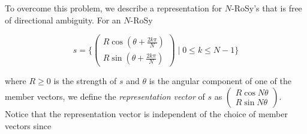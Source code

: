 \documentclass{acmsiggraph}               %
\begin{document}
%

To overcome this problem, we describe a representation for
$N$-RoSy's that is free of directional ambiguity. For an $N$-RoSy

\begin{equation}
s=\{\begin{pmatrix} R\cos(\theta + \frac{2k\pi}{N}) \\ R\sin(\theta
+ \frac{2k\pi}{N})
\end{pmatrix} \mid 0 \le k \le N-1 \}
\end{equation}

\noindent where $R\ge 0$ is the strength of $s$ and $\theta$ is the
angular component of one of the member vectors, we define the {\em
representation vector} of $s$ as $\begin{pmatrix} R\cos N\theta \\
R\sin N\theta \end{pmatrix}$. Notice that the representation vector
is independent of the choice of member vectors since
\end{document}
